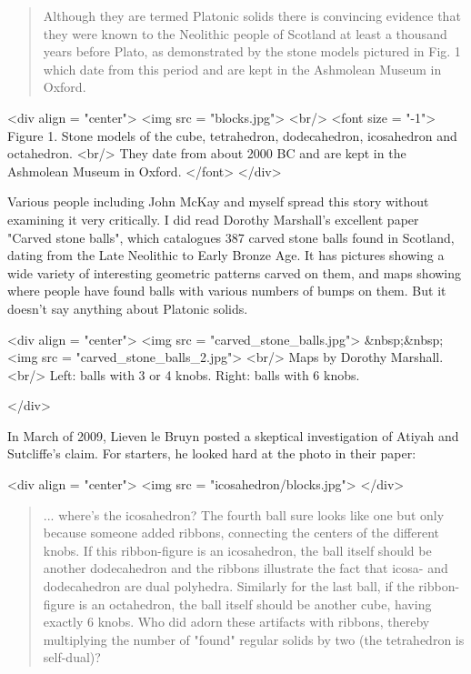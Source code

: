 \begin{quote}
   Although they are termed Platonic solids there is convincing 
   evidence that they were known to the Neolithic people of Scotland 
   at least a thousand years before Plato, as demonstrated by the stone
   models pictured in Fig. 1 which date from this period and are kept 
   in the Ashmolean Museum in Oxford.
\end{quote}

<div align = "center">
<img src = "blocks.jpg">
<br/>
<font size = "-1">
Figure 1.  Stone models of the cube, tetrahedron, dodecahedron,
icosahedron and octahedron. <br/> They date from about 2000 BC and are
kept in the Ashmolean Museum in Oxford.
</font>
</div>

Various people including John McKay and myself spread this story without
examining it very critically.  I did read Dorothy Marshall's excellent
paper "Carved stone balls", which catalogues 387 carved stone balls 
found in Scotland, dating from the Late Neolithic to Early Bronze Age.
It has pictures showing a wide variety of interesting geometric 
patterns carved on them, and maps showing where people have found 
balls with various numbers of bumps on them.  But it doesn't say 
anything about Platonic solids.

<div align = "center">
<img src = "carved_stone_balls.jpg">
&nbsp;&nbsp;
<img src = "carved_stone_balls_2.jpg">
<br/>
Maps by Dorothy Marshall. <br/>
Left: balls with 3 or 4 knobs.
Right: balls with 6 knobs.

</div>


In March of 2009, Lieven le Bruyn posted a skeptical investigation of 
Atiyah and Sutcliffe's claim.  For starters, he looked hard at the
photo in their paper:

<div align = "center">
<img src = "icosahedron/blocks.jpg">
</div>

\begin{quote}
   ... where's the icosahedron?  The fourth ball sure looks like one 
   but only because someone added ribbons, connecting the centers of 
  the different knobs.  If this ribbon-figure is an icosahedron, the 
  ball itself should be another dodecahedron and the ribbons illustrate
  the fact that icosa- and dodecahedron are dual polyhedra.  Similarly 
  for the last ball, if the ribbon-figure is an octahedron, the ball 
  itself should be another cube, having exactly 6 knobs.  Who did adorn
  these artifacts with ribbons, thereby multiplying the number of 
  "found" regular solids by two (the tetrahedron is self-dual)? 
\end{quote}

